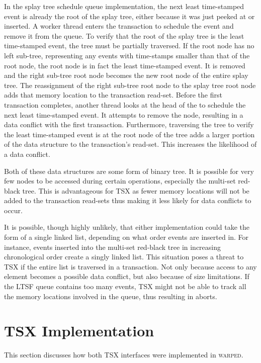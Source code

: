 \documentclass[11pt]{book}
\begin{document}
In the splay tree schedule queue implementation, the next least time-stamped
event is already the root of the splay tree, either because it was just peeked
at or inserted.  A worker thread enters the transaction to schedule the event
and remove it from the queue.  To verify that the root of the splay tree is the
least time-stamped event, the tree must be partially traversed.  If the root
node has no left sub-tree, representing any events with time-stamps smaller than
that of the root node, the root node is in fact the least time-stamped event.
It is removed and the right sub-tree root node becomes the new root node of the
entire splay tree.  The reassignment of the right sub-tree root node to
the splay tree root node adds that memory location to the transaction read-set.
Before the first transaction completes, another thread looks at the head of the 
to schedule the next least time-stamped event.  It attempts to remove the node,
resulting in a data conflict with the first transaction.  Furthermore,
traversing the tree to verify the least time-stamped event is at the root node
of the tree adds a larger portion of the data structure to the transaction's
read-set.  This increases the likelihood of a data conflict. 

Both of these data structures are some form of binary tree.  It is possible for very few
nodes to be accessed during certain operations, especially the multi-set red-black tree.
This is advantageous for TSX as fewer memory locations will not be added to the
transaction read-sets thus making it less likely for data conflicts to occur.

It is possible, though highly unlikely, that either implementation could take the form of
a single linked list, depending on what order events are inserted in.  For instance,
events inserted into the multi-set red-black tree in increasing chronological order create
a singly linked list.  This situation poses a threat to TSX if the entire list is
traversed in a transaction.  Not only because access to any element becomes a possible
data conflict, but also because of size limitations.  If the LTSF queue contains too many
events, TSX might not be able to track all the memory locations involved in the queue,
thus resulting in aborts.

\section{TSX Implementation}

This section discusses how both TSX interfaces were implemented in \textsc{warped}.
\end{document}

